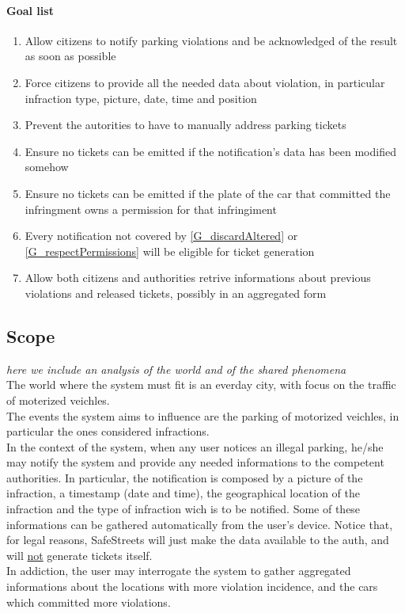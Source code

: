 \documentclass{article}
\newcommand{\enum}[1]{\texttt{#1.\arabic*}}
\begin{document}
		\paragraph{Goal list}
			\begin{enumerate}[label=\enum{G}]
				\item  \label{G_realTime}Allow citizens to notify parking violations and be acknowledged of the result as soon as possible
				\item \label{G_allData}Force citizens to provide all the needed data about violation, in particular infraction type, picture, date, time and position
				\item \label{G_helpAuth}Prevent the autorities to have to manually address parking tickets
				\item \label{G_discardAltered} Ensure no tickets can be emitted if the notification's data has been modified somehow
				\item \label{G_respectPermissions} Ensure no tickets can be emitted if the plate of the car that committed the infringment owns a permission for that infringiment
				\item \label{G_storeFine} Every notification not covered by \ref{G_discardAltered} or \ref{G_respectPermissions} will be eligible for ticket generation
				\item \label{G_statistics}Allow both citizens and authorities retrive informations about previous violations and released tickets, possibly in an aggregated form 
			\end{enumerate}

	\subsection{Scope} \textit{here we include an analysis of the world and of the shared phenomena}\\
	The world where the system must fit is an everday city, with focus on the traffic of moterized veichles.\\
	The events the system aims to influence are the parking of motorized veichles,  in particular the ones considered infractions.\\
	In the context of the system, when any user notices an illegal parking, he/she may notify the system and provide any needed informations to the competent authorities. In particular, the notification is composed by a picture of the infraction, a timestamp (date and time), the geographical location of the infraction and the type of infraction wich is to be notified. Some of these informations can be gathered automatically from the user's device. Notice that, for legal reasons, SafeStreets will just make the data available to the auth, and will \underline{not} generate tickets itself. \\
	In addiction, the user may interrogate the system to gather aggregated informations about the locations with more violation incidence, and the cars which committed more violations. 
	
\end{document}
